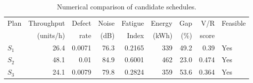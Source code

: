 \begin{table}[htbp]
\centering
\caption{Numerical comparison of candidate schedules.}
\label{tab:numerical-sim}
\small
\begin{tabular}{@{}lrrrrrrrl@{}}
\toprule
Plan & Throughput & Defect & Noise & Fatigue & Energy & Gap & V/R & Feasible \\
     & (units/h)  & rate   & (dB)  & Index   & (kWh)  & (\%) & score &         \\
\midrule
$S_{1}$ & 26.4 & 0.0071 & 76.3 & 0.2165 & 339 & 49.2 & 0.39 & Yes \\
$S_{2}$ & 48.1 & 0.01 & 84.9 & 0.6001 & 462 & 23.0 & 0.474 & Yes \\
$S_{3}$ & 24.1 & 0.0079 & 79.8 & 0.2824 & 359 & 53.6 & 0.364 & Yes \\
\bottomrule
\end{tabular}
\end{table}
